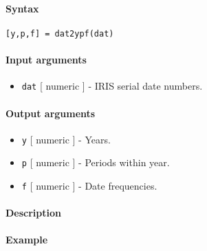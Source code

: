 


	\paragraph{Syntax}\label{syntax}

\begin{verbatim}
[y,p,f] = dat2ypf(dat)
\end{verbatim}

\paragraph{Input arguments}\label{input-arguments}

\begin{itemize}
\itemsep1pt\parskip0pt
\item
  \texttt{dat} {[} numeric {]} - IRIS serial date numbers.
\end{itemize}

\paragraph{Output arguments}\label{output-arguments}

\begin{itemize}
\item
  \texttt{y} {[} numeric {]} - Years.
\item
  \texttt{p} {[} numeric {]} - Periods within year.
\item
  \texttt{f} {[} numeric {]} - Date frequencies.
\end{itemize}

\paragraph{Description}\label{description}

\paragraph{Example}\label{example}


